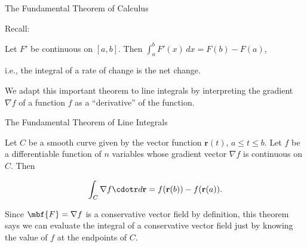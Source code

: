 \documentclass[11pt,english,
handout
]{beamer}
\begin{document}


\makebeamertitle















\begin{frame}[t]{The Fundamental Theorem of Calculus}

Recall:

\lspace
\begin{theorem}
Let $F'$ be continuous on $[a,b]$. Then $\displaystyle \int_a^bF'(x)\,dx=F(b)-F(a)$,

\lspace
i.e., the integral of a rate of change is the net change.
\end{theorem}\pause

\lspace
We adapt this important theorem to line integrals by interpreting the gradient $\nabla f$ of a function $f$ as a ``derivative'' of the function.
\end{frame}











\begin{frame}[t]{The Fundamental Theorem of Line Integrals}

\begin{theorem}
Let $C$ be a smooth curve given by the vector function $\mathbf{r}(t)$, $a\leq t\leq b$. Let $f$ be a differentiable function of $n$ variables whose gradient vector $\nabla f$ is continuous on $C$. Then

\[
\int_C\nabla f\cdotr d\mathbf{r}=f(\mathbf{r}(b))-f(\mathbf{r}(a)).
\]
\end{theorem}\pause


Since $\mbf{F}=\nabla f$ is a conservative vector field by definition, this theorem says we can evaluate the integral of a conservative vector field just by knowing the value of $f$ at the endpoints of $C$. 
\end{frame}
\end{document}

